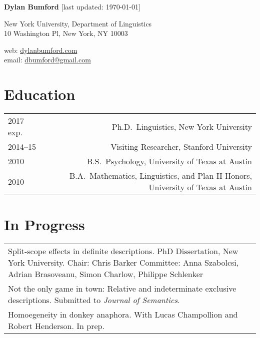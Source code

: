 \documentclass[12pt]{article}
\renewcommand{\arraystretch}{1.5} %
\begin{document}
\textbf{Dylan Bumford}\hfill
{\color{gray}[last updated: \today]}

\bigskip

\begin{minipage}[t]{0.55\textwidth}
New York University, Department of Linguistics\\
10 Washington Pl, New York, NY 10003
\end{minipage}
\begin{minipage}[t]{\linegoal}
\raggedleft%
web: \url{dylanbumford.com}\\
email: \href{mailto:dbumford@gmail.com}{dbumford@gmail.com}
\end{minipage}

\bigskip

\section*{Education}

\begingroup
\renewcommand{\arraystretch}{1} %
\begin{longtable}{LR}
  2017 exp.   & Ph.D.~Linguistics, New York University\\
  2014--15    & Visiting Researcher, Stanford University\\
  2010        & B.S.~Psychology, University of Texas at Austin\\
  2010        & B.A.~Mathematics, Linguistics, and Plan II Honors, University of
                Texas at Austin
\end{longtable}
\endgroup

\bigskip

\section*{In Progress}

\begin{longtable}{@{}p{\textwidth}@{}}
  Split-scope effects in definite descriptions. PhD Dissertation, New York
  University.\newline
  Chair: Chris Barker\newline
  Committee: Anna Szabolcsi, Adrian Brasoveanu, Simon Charlow, Philippe
  Schlenker\\
  Not the only game in town: Relative and indeterminate exclusive
  descriptions. Submitted to \textit{Journal of Semantics}.\\
  Homoegeneity in donkey anaphora. With Lucas Champollion and Robert Henderson. In
  prep.
\end{longtable}
\end{document}
